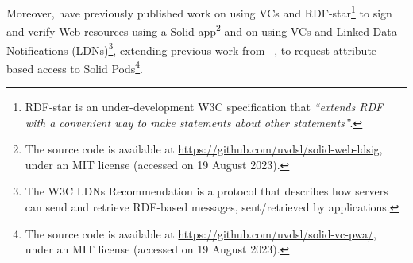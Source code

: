Moreover, \cite{braun_selfverifying_2022,braun_attributebased_2022} have previously published work on using VCs and RDF-star\footnote{RDF-star\citep{arndt_rdfstar_2023} is an under-development W3C specification that \textit{``extends RDF with a convenient way to make statements about other statements''}.} to sign and verify Web resources using a Solid app\footnote{The source code is available at \url{https://github.com/uvdsl/solid-web-ldsig}, under an MIT license (accessed on 19 August 2023).} and on using VCs and Linked Data Notifications (LDNs)\footnote{The W3C LDNs Recommendation \citep{capadisli_linked_2017} is a protocol that describes how servers can send and retrieve RDF-based messages, sent/retrieved by applications.}, extending previous work from~ \citeauthor{ezike_solidvc_2019}, to request attribute-based access to Solid Pods\footnote{The source code is available at \url{https://github.com/uvdsl/solid-vc-pwa/}, under an MIT license (accessed on 19 August 2023).}.



